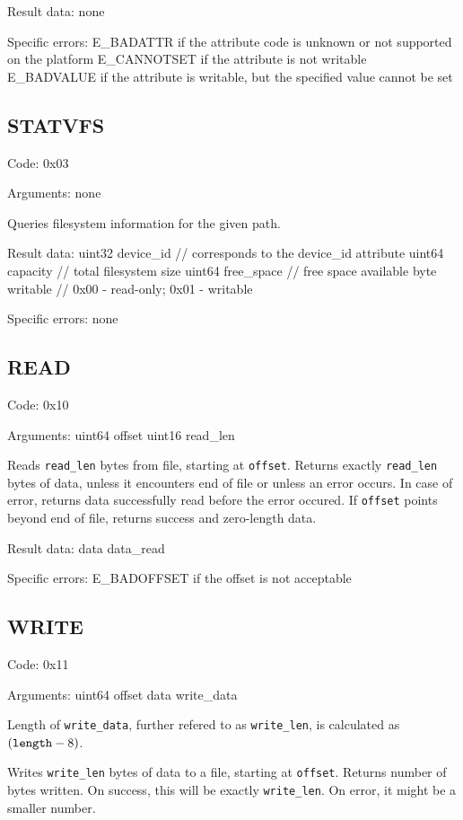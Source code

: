 Result data: none

Specific errors:
	E\_BADATTR if the attribute code is unknown or not supported on the platform
	E\_CANNOTSET if the attribute is not writable
	E\_BADVALUE if the attribute is writable, but the specified value cannot be set

\subsection{STATVFS}

Code: 0x03

Arguments: none

Queries filesystem information for the given path.

Result data:
uint32 device\_id // corresponds to the device\_id attribute
uint64 capacity // total filesystem size
uint64 free\_space // free space available
byte writable // 0x00 - read-only; 0x01 - writable

Specific errors: none

\subsection{READ}

Code: 0x10

Arguments:
uint64 offset
uint16 read\_len

Reads {\tt read\_len} bytes from file, starting at {\tt offset}. Returns exactly {\tt read\_len} bytes of
data, unless it encounters end of file or unless an error occurs. In case of error, returns data successfully
read before the error occured. If {\tt offset} points beyond end of file, returns success and zero-length
data.

Result data:
data data\_read

Specific errors:
	E\_BADOFFSET if the offset is not acceptable

\subsection{WRITE}
\label{ssec:WRITE}

Code: 0x11

Arguments:
uint64 offset
data write\_data

Length of {\tt write\_data}, further refered to as {\tt write\_len}, is calculated as $({\tt length} - 8)$.

Writes {\tt write\_len} bytes of data to a file, starting at {\tt offset}. Returns number of bytes written. On
success, this will be exactly {\tt write\_len}. On error, it might be a smaller number.

